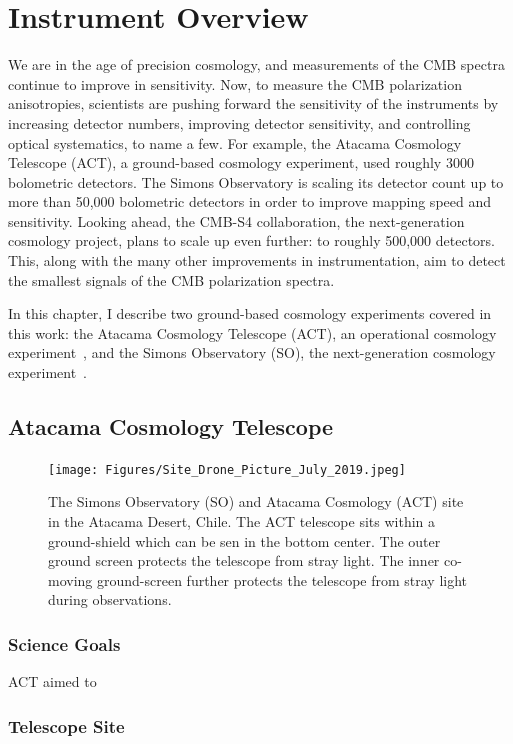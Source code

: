 \chapter{Instrument Overview}
\label{ch:instruments}

We are in the age of precision cosmology, and measurements of the CMB spectra continue to improve in sensitivity.  Now, to measure the CMB polarization anisotropies, scientists are pushing forward the sensitivity of the instruments by increasing detector numbers, improving detector sensitivity, and controlling optical systematics, to name a few.  For example, the Atacama Cosmology Telescope (ACT), a ground-based cosmology experiment, used roughly 3000 bolometric detectors.  The Simons Observatory is scaling its detector count up to more than 50,000 bolometric detectors in order to improve mapping speed and sensitivity.  Looking ahead, the CMB-S4 collaboration, the next-generation cosmology project, plans to scale up even further: to roughly 500,000 detectors.  This, along with the many other improvements in instrumentation, aim to detect the smallest signals of the CMB polarization spectra.

In this chapter, I describe two ground-based cosmology experiments covered in this work: the Atacama Cosmology Telescope (ACT), an operational cosmology experiment~\cite{act_inst}, and the Simons Observatory (SO), the next-generation cosmology experiment~\cite{so19}. 

\section{Atacama Cosmology Telescope}
\begin{figure}[ht]
    \centering
    \texttt{[image: Figures/Site\_Drone\_Picture\_July\_2019.jpeg]}
    \caption{The Simons Observatory (SO) and Atacama Cosmology (ACT) site in the Atacama Desert, Chile. The ACT telescope sits within a ground-shield which can be sen in the bottom center.  The outer ground screen protects the telescope from stray light.  The inner co-moving ground-screen further protects the telescope from stray light during observations.}
    \label{fig:act_so_site}
\end{figure}


\subsection{Science Goals}
ACT aimed to 
\subsection{Telescope Site}

